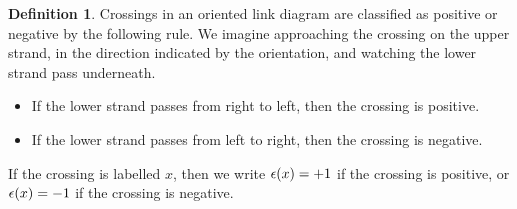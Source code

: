 \documentclass[reqno]{amsart}
\theoremstyle{definition}
\newtheorem{definition}[theorem]{Definition}
\begin{document}
\begin{definition}\label{defn-crossing-sign}
 Crossings in an oriented link diagram are classified as positive or
 negative by the following rule.  We imagine approaching the crossing
 on the upper strand, in the direction indicated by the orientation,
 and watching the lower strand pass underneath.  
 \begin{itemize}
  \item If the lower strand passes from right to left, then the
   crossing is positive.
  \item If the lower strand passes from left to right, then the
   crossing is negative.
 \end{itemize}
 If the crossing is labelled $x$, then we write $\epsilon(x)=+1$ if the
 crossing is positive, or $\epsilon(x)=-1$ if the crossing is negative. 
\end{definition}
\end{document}

